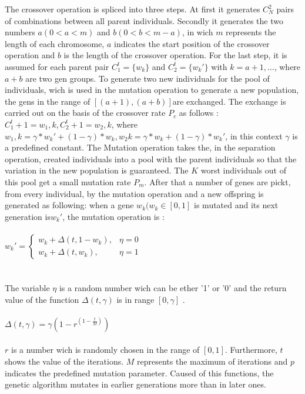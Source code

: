 \documentclass[../masterarbeit.tex]{subfiles}
\begin{document}
The crossover operation is spliced into three steps. At first it generates \(C_N^2\) pairs of combinations between all parent individuals. 
Secondly it generates the two numbers \(a(0 < a < m)\) and \(b(0 < b < m − a)\), in wich \(m\) represents the length of each chromosome, \(a\) indicates the start position of the crossover operation and \(b\) is the length of the crossover operation. 
For the last step, it is assumed for each parent pair \(C_1^t = \{w_k\}\) and \(C_2^t = \{w_k'\}\) with \( k = a + 1, …\), where \(a + b \) are two gen groups. To generate two new individuals for the pool of individuals, wich is used in the mutation operation to generate a new population, the gens in the range of \([(a + 1), (a + b)]\)are exchanged. The exchange is carried out on the basis of the crossover rate \(P_c\) as follows \textcite[]{LU2008887}: \newline
\(C_1^t+1 = {w_1,k}, C_2^t+1 = {w_2,k} \), where \(w_1,k = \gamma * w_k' + (1 - \gamma) * w_k, w_2k = \gamma * w_k + (1 - \gamma) * w_k' \), in this context \(\gamma \) is a predefined constant.
The Mutation operation takes the, in the separation operation, created individuals into a pool with the parent individuals so that the variation in the new population is guaranteed. The \(K\) worst individuals out of this pool get a small mutation rate \(P_m\). After that a number of genes are pickt, from every individual, by the mutation operation and a new offspring is generated as following: when a gene \(w_k(w_k \in [0,1] \) is mutated and its next generation is\(w_k'\), the mutation operation is \textcite[]{LU2008887}: \\~\\
\( w_k' =
  \begin{cases}
    w_k + \Delta(t, 1 - w_k), & \eta = 0\\
    w_k + \Delta(t, w_k), & \eta = 1 
  \end{cases}
 \) \hfill \textcite[]{LU2008887} \\~\\~\\
 The variable \(\eta\) is a random number wich can be ether '1' or '0' and the return value of the function \(\Delta(t, \gamma)\) is in range \([0, \gamma]\) \textcite[]{LU2008887}.\\~\\
\(\Delta(t, \gamma) = \gamma (1 - r^{(1-\frac{t}{M})})\) \hfill \textcite[]{LU2008887} \\~\\
\(r\) is a number wich is randomly chosen in the range of \([0,1]\). Furthermore, \(t\) shows the value of the iterations. \(M\) represents the maximum of iterations and \(p\) indicates the predefined mutation parameter. Caused of this functions, the genetic algorithm mutates in earlier generations more than in later ones. \autocite[]{LU2008887} \newline
\end{document}
